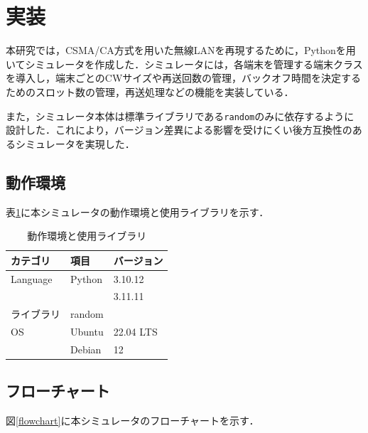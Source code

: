 \documentclass[a4paper,10pt]{ltjsarticle}
\begin{document}
\clearpage
\section{実装}

本研究では，CSMA/CA方式を用いた無線LANを再現するために，Pythonを用いてシミュレータを作成した．シミュレータには，各端末を管理する端末クラスを導入し，端末ごとのCWサイズや再送回数の管理，バックオフ時間を決定するためのスロット数の管理，再送処理などの機能を実装している．

また，シミュレータ本体は標準ライブラリである\texttt{random}のみに依存するように設計した．これにより，バージョン差異による影響を受けにくい後方互換性のあるシミュレータを実現した．


\subsection{動作環境}

表\ref{tab:env}に本シミュレータの動作環境と使用ライブラリを示す．



\begin{table}[h]
  \centering
  \caption{動作環境と使用ライブラリ}
  \label{tab:env}
  \begin{tabular}{l|l|l}
      \hline
      カテゴリ & 項目 & バージョン \\ \hline
      Language           & Python        & 3.10.12 \\ 
      &               & 3.11.11 \\ \hline
      ライブラリ       & random         & \\ \hline
      OS               & Ubuntu        & 22.04 LTS \\ 
                       & Debian        & 12 \\ \hline
  \end{tabular}
\end{table}



\subsection{フローチャート}
図\ref{flowchart}に本シミュレータのフローチャートを示す．
\end{document}

